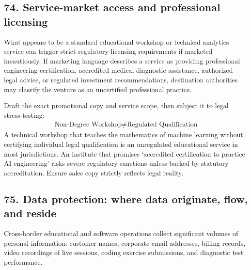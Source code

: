 \subsection{74. Service-market access and professional licensing}

What appears to be a standard educational workshop or technical analytics service can trigger strict regulatory licensing requirements if marketed incautiously. If marketing language describes a service as providing professional engineering certification, accredited medical diagnostic assistance, authorized legal advice, or regulated investment recommendations, destination authorities may classify the venture as an uncertified professional practice.

Draft the exact promotional copy and service scope, then subject it to legal stress-testing:
\begin{equation}
\begin{aligned}
\text{Non-Degree Workshop} \neq \text{Regulated Qualification}
\end{aligned}
\end{equation}
A technical workshop that teaches the mathematics of machine learning without certifying individual legal qualification is an unregulated educational service in most jurisdictions. An institute that promises `accredited certification to practice AI engineering' risks severe regulatory sanctions unless backed by statutory accreditation. Ensure sales copy strictly reflects legal reality.

\subsection{75. Data protection: where data originate, flow, and reside}

Cross-border educational and software operations collect significant volumes of personal information: customer names, corporate email addresses, billing records, video recordings of live sessions, coding exercise submissions, and diagnostic test performance.

